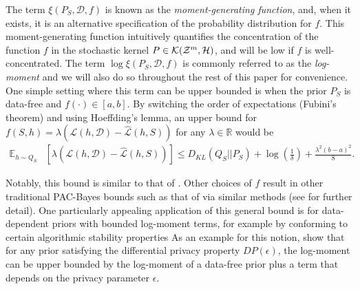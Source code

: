 \documentclass{article} %
\theoremstyle{definition}
\begin{document}
The term $\xi(P_S, \mathcal{D}, f)$ is known as the \emph{moment-generating function}, and, when it exists, it is an alternative specification of the probability distribution for $f$.
This moment-generating function intuitively quantifies the concentration of the function $f$ in the stochastic kernel $P\in{\cal K}({\cal Z}^m,{\cal H})$, and will be low if $f$ is well-concentrated.
The term $\log\xi(P_S, \mathcal{D}, f)$ is commonly referred to as the \emph{log-moment} and we will also do so throughout the rest of this paper for convenience. 
One simple setting where this term can be upper bounded is when the prior $P_S$ is data-free and $f(\cdot)\in[a,b]$. By switching the order of expectations (Fubini's theorem) and using Hoeffding's lemma, an upper bound for $f(S,h)=\lambda(\mathcal{L}(h,\mathcal{D})-\hat{\mathcal{L}}(h, S))$ for any $\lambda\in \mathbb{R}$ would be
\begin{align} 
    \mathbb{E}_{h\sim Q_S}&\left [\lambda(\mathcal{L}(h,\mathcal{D})-\hat{\mathcal{L}}(h, S))\right ]
     \leq D_{KL}(Q_S||P_S) \nonumber
    +\log\left (\frac{1}{\delta}\right ) + \frac{\lambda^2(b-a)^2}{8} .
\end{align}

Notably, this bound is similar to that of \citet{Catoni2004}. Other choices of $f$ result in other traditional PAC-Bayes bounds such as that of \citet{Mcallester} via similar methods (see \citet{Rivasplata2020} for further detail). 
One particularly appealing application of this general bound is for data-dependent priors with bounded log-moment terms, for example by conforming to certain algorithmic stability properties 
As an example for this notion, \citet{Rivasplata2020} show that for any prior satisfying the differential privacy property $DP(\epsilon)$, the log-moment can be upper bounded by the log-moment of a data-free prior plus a term that depends on the privacy parameter $\epsilon$. 
\end{document}
